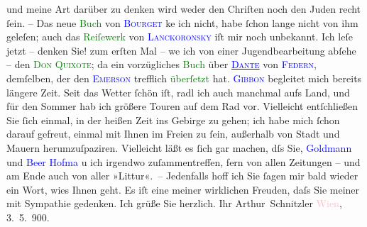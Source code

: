                und meine Art darüber zu denken wird weder den Chriſten noch den Juden recht ſein. –
               Das neue \textcolor{green}{Buch}{} von \textcolor{blue}{\textsc{Bour{\pb}get}}{}\ledrightnote{\textcolor{blue}{Paul Bourget}} ke{\geminationn} ich nicht, habe ſchon lange nicht von ihm
               geleſen; auch das \textcolor{green}{Reiſewerk}{} von
                  \textcolor{blue}{\textsc{Lanckoronsky}}{}\ledrightnote{\textcolor{blue}{Karl Lanckoroński}} iſt mir noch unbekannt. Ich leſe jetzt – denken Sie! zum erſten Mal – we{\geminationn} ich von einer Jugendbearbeitung abſehe – den \textcolor{green}{\textsc{Don Quixote}}{}\ledrightnote{\textcolor{green}{Don Quijote}}; da{\geminationn} ein vorzügliches \textcolor{green}{Buch}{} über \textcolor{blue}{\textsc{\uline{Dante}}}{}\ledrightnote{\textcolor{blue}{Dante Alighieri}} von \textcolor{blue}{\textsc{Federn}}{}\ledrightnote{\textcolor{blue}{Karl Federn}}, demſelben, der den \textcolor{blue}{\textsc{Emerson}}{}\ledrightnote{\textcolor{blue}{Ralph Waldo Emerson}} trefflich \textcolor{green}{überſetzt}{} hat.
                  \textcolor{green}{\textcolor{blue}{\textsc{Gibbon}}{}\ledrightnote{\textcolor{blue}{Edward Gibbon}}}{} begleitet mich bereits längere Zeit.\pend
           \pstart
           Seit das Wetter ſchön iſt, radl ich auch manchmal aufs Land, und für den Sommer hab
               ich {\pb}größere Touren auf dem Rad vor. Vielleicht
               entſchließen Sie ſich einmal, in der heißen Zeit ins Gebirge zu gehen; ich habe mich
               ſchon darauf  gefreut,
               einmal mit Ihnen im Freien zu ſein, außerhalb von Stadt und Mauern herumzuſpaziren.
               Vielleicht läßt es ſich gar machen, dſs Sie, \textcolor{blue}{Goldmann}{}\ledrightnote{\textcolor{blue}{Paul Goldmann}} und \textcolor{blue}{Beer Hofma{\geminationn}}{}\ledrightnote{\textcolor{blue}{Richard Beer-Hofmann}} u ich irgendwo zuſammentreffen, fern von allen Zeitungen – und am Ende auch von
               aller »Lit\damage{\textcolor{gray}{era}}tur«. –\pend
           \pstart
           Jedenfalls hoff ich Sie ſagen mir bald wieder ein Wort, wies Ihnen {\pb}geht. Es iſt eine meiner wirklichen Freuden, daſs
               Sie meiner mit Sympathie gedenken. Ich grüße Sie herzlich.\pend
           \pstart Ihr \spacefill\mbox{Arthur Schnitzler}\pend{}\pstart
           \textcolor{pink}{Wien}{}\ledrightnote{\textcolor{pink}{Wien}}, 3. 5. 900.\pend
           \endnumbering{}  
      